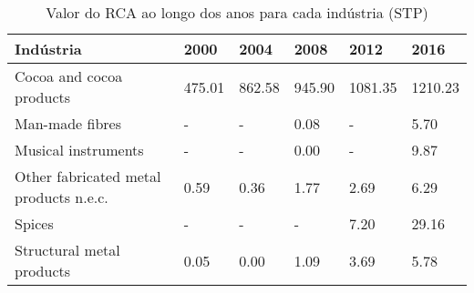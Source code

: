 \begin{table}
\centering
\caption{Valor do RCA ao longo dos anos para cada indústria (STP)}
\label{tab:ex3-tempo-STP}
\begin{tabular}{p{6cm}p{1.5cm}p{1.5cm}p{1.5cm}p{1.5cm}p{1.5cm}}
\toprule
                             Indústria &   2000 &   2004 &   2008 &    2012 &    2016 \\
\midrule
              Cocoa and cocoa products & 475.01 & 862.58 & 945.90 & 1081.35 & 1210.23 \\
                       Man-made fibres &      - &      - &   0.08 &       - &    5.70 \\
                   Musical instruments &      - &      - &   0.00 &       - &    9.87 \\
Other fabricated metal products n.e.c. &   0.59 &   0.36 &   1.77 &    2.69 &    6.29 \\
                                Spices &      - &      - &      - &    7.20 &   29.16 \\
             Structural metal products &   0.05 &   0.00 &   1.09 &    3.69 &    5.78 \\
\bottomrule
\end{tabular}
\end{table}
